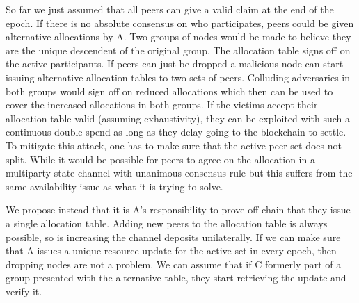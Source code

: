 So far we just assumed that all peers can give a valid claim at the end of the epoch. 
If there is no absolute consensus on who participates, 
peers could be given alternative allocations by A. Two groups of nodes would be made to believe they are the unique descendent of the original group. The allocation table signs off on the active participants.
If peers can just be dropped a malicious node can start issuing alternative allocation tables to two sets of peers. Colluding adversaries in both groups would sign off on reduced allocations which then can be used to cover the increased allocations in both groups. If the victims accept their allocation table valid (assuming exhaustivity), they can be exploited with such a continuous double spend as long as they delay going to the blockchain to settle. To mitigate this attack, one has to make sure that the active peer set does not split. While it would be possible for peers to agree on the allocation in a multiparty state channel with unanimous consensus rule but this suffers from the same availability issue as what it is trying to solve.

We propose instead that it is A's responsibility to prove off-chain that they issue a single allocation table. 
Adding new peers to the allocation table is always possible, so is increasing the channel deposits unilaterally. 
If we can make sure that A issues a unique resource update for the active set in every epoch, then dropping nodes are not a problem. 
We can assume that if C formerly part of a group presented with the alternative table, they start retrieving the update and verify it. 

